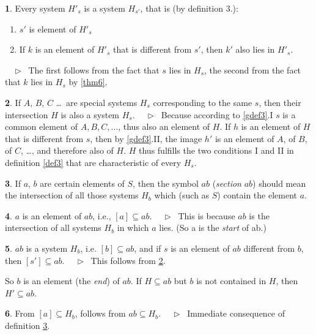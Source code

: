 \documentclass[leqno,hidelinks,10pt]{article}
\theoremstyle{definition}
\newtheorem{satz}{\protect\satzname}
\newtheorem{deff}[satz]{\protect\deffname}
\newcommand{\satzname}{}
\newcommand{\deffname}{}
\renewcommand{\satzname}{\hspace{-4pt}.\ Satz}%
\renewcommand{\deffname}{\hspace{-4pt}.\ Definition}%
\renewcommand{\satzname}{\hspace{-4pt}.\ Theorem}%
\renewcommand{\deffname}{\hspace{-4pt}.\ Definition}%
\newcommand\Beweis{\medskip \newline $ \phantom{'.'} \rhd \ $}%
\newcommand\beweis{ $ \phantom{'.'} \rhd \ $}%
\newcommand{\partof}{\subseteq}
\newcommand{\sref}[1]{\underline{\ref{#1}}}%
\begin{document}
\begin{paracol}{2}
\begin{rightcolumn}
\begin{satz}\label{thm7}
Every system $H'_s$ is a system $H_{s'}$, that is (by definition 3.):
\begin{enumerate}[I'.]
	\item $s'$ is element of $H'_s$
	\item If $k$ is an element of $H'_s$ that is different from $s'$, then $k'$
    also lies in $H'_s$.
\end{enumerate}
\beweis
The first follows from the fact that $s$ lies in $H_s$, the second from the fact
that $k$ lies in $H_s$ by \sref{thm6}.
\end{satz}

\begin{satz}\label{thm8}
If $A$, $B$, $C$ \ldots\ are special systems $H_s$ corresponding to the same $s$,
then their intersection $H$ is also a system $H_s$.
\Beweis
Because according to \sref{gdef3}.I $s$ is a common element of
$A, B, C, \ldots$, thus also an element of $H$. If $h$ is an element of $H$ that
is different from $s$, then by \sref{gdef3}.II, the image $h'$
is an element of $A$, of $B$, of $C$, \ldots, and therefore also of $H$. $H$ thus
fulfills the two conditions I and II in definition \sref{def3} that are
characteristic of every $H_s$.
\end{satz}

\begin{deff}\label{def9}
If $a$, $b$ are certain elements of $S$, then the symbol $ab$ (\emph{section} $ab$)
should mean the intersection of all those systems $H_b$ which (such as $S$)
contain the element $a$.%
\end{deff}

\newpage
\begin{satz}\label{thm10}
$a$ is an element of $ab$, i.e., $[a] \partof ab$.
\Beweis
This is because $ab$ is the intersection of all systems $H_b$ in which $a$ lies.
(So a is the \emph{start} of ab.)
\end{satz}

\begin{satz}\label{thm11}
$ab$ is a system $H_b$, i.e. $[b] \partof ab$, and if $s$ is an element of $ab$
different from $b$, then $[s'] \partof ab$.
\Beweis
This follows from \sref{thm8}.
\end{satz}

So $b$ is an element (the \emph{end}) of $ab$. If $H \partof ab$ but $b$ is not
contained in $H$, then $H' \partof ab$.

\begin{satz}\label{thm12}
From $[a] \partof H_b$, follows from $ab \partof H_b$.
\Beweis
Immediate consequence of definition \sref{def9}.
\end{satz}


\end{rightcolumn}
\end{paracol}
\end{document}
